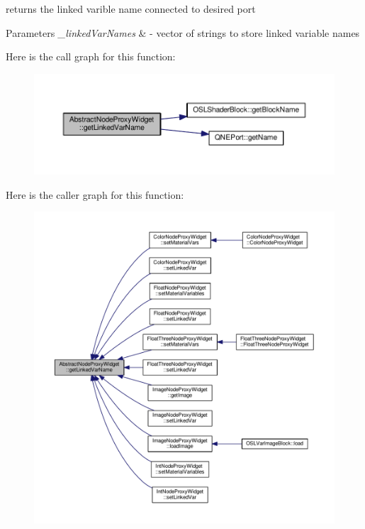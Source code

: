 returns the linked varible name connected to desired port 


\begin{DoxyParams}{Parameters}
{\em \-\_\-linked\-Var\-Names} & -\/ vector of strings to store linked variable names \\
\hline
\end{DoxyParams}


Here is the call graph for this function\-:
\nopagebreak
\begin{figure}[H]
\begin{center}
\leavevmode
\includegraphics[width=350pt]{class_abstract_node_proxy_widget_aeac0d3fa1930be2396e2ab7c5bf04d35_cgraph}
\end{center}
\end{figure}




Here is the caller graph for this function\-:
\nopagebreak
\begin{figure}[H]
\begin{center}
\leavevmode
\includegraphics[width=350pt]{class_abstract_node_proxy_widget_aeac0d3fa1930be2396e2ab7c5bf04d35_icgraph}
\end{center}
\end{figure}




